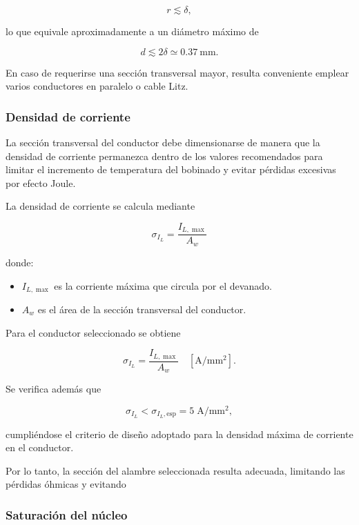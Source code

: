 \documentclass[]{article}
\begin{document}
	\[
	r\lesssim\delta,
	\]
	
	lo que equivale aproximadamente a un diámetro máximo de
	
	\[
	d\lesssim2\delta
	\simeq0.37\ \mathrm{mm}.
	\]
	
	En caso de requerirse una sección transversal mayor, resulta conveniente emplear varios conductores en paralelo o cable Litz.
	
	\subsubsection{Densidad de corriente}
	
	La sección transversal del conductor debe dimensionarse de manera que la densidad de corriente permanezca dentro de los valores recomendados para limitar el incremento de temperatura del bobinado y evitar pérdidas excesivas por efecto Joule.
	
	La densidad de corriente se calcula mediante
	
	\begin{equation}
		\sigma_{I_L}=\frac{I_{L,\max}}{A_w}
		\label{eq:densidad_corriente}
	\end{equation}
	
	donde:
	
	\begin{itemize}
		\item $I_{L,\max}$ es la corriente máxima que circula por el devanado.
		\item $A_w$ es el área de la sección transversal del conductor.
	\end{itemize}
	
	Para el conductor seleccionado se obtiene
	
	\[
	\sigma_{I_L}
	=
	\frac{I_{L,\max}}{A_w}
	\quad
	[\mathrm{A/mm^2}].
	\]
	
	Se verifica además que
	
	\begin{equation}
		\sigma_{I_L}
		<
		\sigma_{I_L,\mathrm{esp}}
		=
		5\;\mathrm{A/mm^2},
	\end{equation}
	
	cumpliéndose el criterio de diseño adoptado para la densidad máxima de corriente en el conductor.
	
	Por lo tanto, la sección del alambre seleccionada resulta adecuada, limitando las pérdidas óhmicas y evitando
	\subsubsection{Saturación del núcleo} 
	
\end{document}
